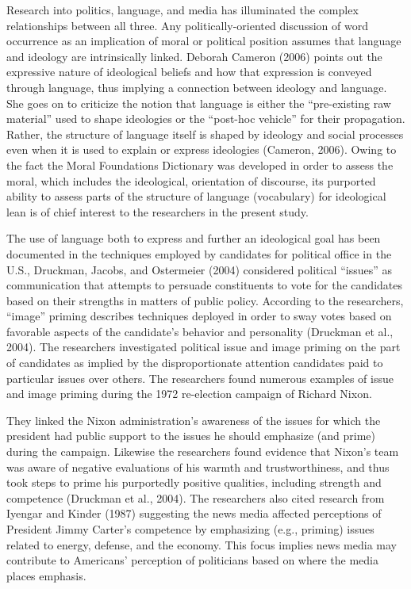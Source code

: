 \documentclass[,man]{apa6}
\begin{document}
Research into politics, language, and media has illuminated the complex
relationships between all three. Any politically-oriented discussion of
word occurrence as an implication of moral or political position assumes
that language and ideology are intrinsically linked. Deborah Cameron
(2006) points out the expressive nature of ideological beliefs and how
that expression is conveyed through language, thus implying a connection
between ideology and language. She goes on to criticize the notion that
language is either the \enquote{pre-existing raw material} used to shape
ideologies or the \enquote{post-hoc vehicle} for their propagation.
Rather, the structure of language itself is shaped by ideology and
social processes even when it is used to explain or express ideologies
(Cameron, 2006). Owing to the fact the Moral Foundations Dictionary was
developed in order to assess the moral, which includes the ideological,
orientation of discourse, its purported ability to assess parts of the
structure of language (vocabulary) for ideological lean is of chief
interest to the researchers in the present study.

The use of language both to express and further an ideological goal has
been documented in the techniques employed by candidates for political
office in the U.S., Druckman, Jacobs, and Ostermeier (2004) considered
political \enquote{issues} as communication that attempts to persuade
constituents to vote for the candidates based on their strengths in
matters of public policy. According to the researchers, \enquote{image}
priming describes techniques deployed in order to sway votes based on
favorable aspects of the candidate's behavior and personality (Druckman
et al., 2004). The researchers investigated political issue and image
priming on the part of candidates as implied by the disproportionate
attention candidates paid to particular issues over others. The
researchers found numerous examples of issue and image priming during
the 1972 re-election campaign of Richard Nixon.

They linked the Nixon administration's awareness of the issues for which
the president had public support to the issues he should emphasize (and
prime) during the campaign. Likewise the researchers found evidence that
Nixon's team was aware of negative evaluations of his warmth and
trustworthiness, and thus took steps to prime his purportedly positive
qualities, including strength and competence (Druckman et al., 2004).
The researchers also cited research from Iyengar and Kinder (1987)
suggesting the news media affected perceptions of President Jimmy
Carter's competence by emphasizing (e.g., priming) issues related to
energy, defense, and the economy. This focus implies news media may
contribute to Americans' perception of politicians based on where the
media places emphasis.
\end{document}
